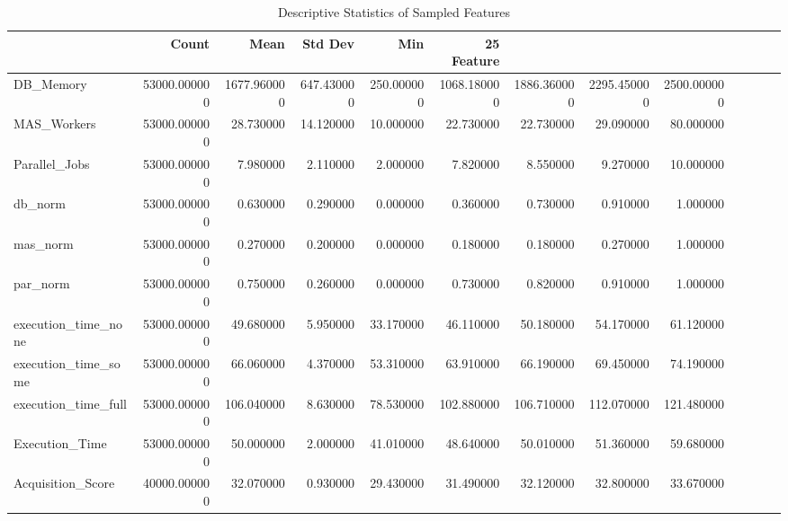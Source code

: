 \begin{table}
\caption{Descriptive Statistics of Sampled Features}
\label{tab:data_summary}
\begin{tabular}{lrrrrrrrr}
\toprule
 & Count & Mean & Std Dev & Min & 25%
Feature &  &  &  &  &  &  &  &  \\
\midrule
DB_Memory & 53000.000000 & 1677.960000 & 647.430000 & 250.000000 & 1068.180000 & 1886.360000 & 2295.450000 & 2500.000000 \\
MAS_Workers & 53000.000000 & 28.730000 & 14.120000 & 10.000000 & 22.730000 & 22.730000 & 29.090000 & 80.000000 \\
Parallel_Jobs & 53000.000000 & 7.980000 & 2.110000 & 2.000000 & 7.820000 & 8.550000 & 9.270000 & 10.000000 \\
db_norm & 53000.000000 & 0.630000 & 0.290000 & 0.000000 & 0.360000 & 0.730000 & 0.910000 & 1.000000 \\
mas_norm & 53000.000000 & 0.270000 & 0.200000 & 0.000000 & 0.180000 & 0.180000 & 0.270000 & 1.000000 \\
par_norm & 53000.000000 & 0.750000 & 0.260000 & 0.000000 & 0.730000 & 0.820000 & 0.910000 & 1.000000 \\
execution_time_none & 53000.000000 & 49.680000 & 5.950000 & 33.170000 & 46.110000 & 50.180000 & 54.170000 & 61.120000 \\
execution_time_some & 53000.000000 & 66.060000 & 4.370000 & 53.310000 & 63.910000 & 66.190000 & 69.450000 & 74.190000 \\
execution_time_full & 53000.000000 & 106.040000 & 8.630000 & 78.530000 & 102.880000 & 106.710000 & 112.070000 & 121.480000 \\
Execution_Time & 53000.000000 & 50.000000 & 2.000000 & 41.010000 & 48.640000 & 50.010000 & 51.360000 & 59.680000 \\
Acquisition_Score & 40000.000000 & 32.070000 & 0.930000 & 29.430000 & 31.490000 & 32.120000 & 32.800000 & 33.670000 \\
\bottomrule
\end{tabular}
\end{table}
